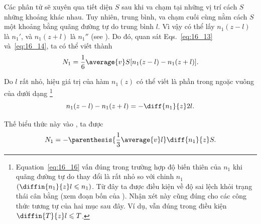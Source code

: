 Các phân tử sẽ xuyên qua tiết diện $S$ sau khi va chạm tại những vị trí cách $S$ những khoảng khác nhau. Tuy nhiên, trung bình, va chạm cuối cùng nằm cách $S$ một khoảng bằng quãng đường tự do trung bình $l$. Vì vậy có thể lấy $n_1(z-l)$ là $n_1'$, và $n_1(z+l)$ là $n_1''$ (see ). Do đó, quan sát Eqs.~\eqref{eq:16_13} và~\eqref{eq:16_14}, ta có thể viết thành
\begin{equation}\label{eq:16_15}
    N_1 = \frac{1}{6}\average{v} S [n_1(z-l) - n_1(z+l)].
\end{equation}

Do $l$ rất nhỏ, hiệu giá trị của hàm $n_1(z)$ có thể viết là phần trong ngoặc vuông của  dưới dạng \footnote{Equation~\eqref{eq:16_16} vấn đúng trong trường hợp độ biến thiên của $n_1$ khi quãng đường tự do thay đổi là rất nhỏ so với chinh $n_1$  $(\diffin{n_1}{z}l\leqslant n_1)$. Từ đây ta được điều kiện về độ sai lệch khỏi trạng thái cân bằng (xem đoạn bốn của ). Nhận xét này cũng đúng cho các công thức tương tự của hai mục sau đây. Ví dụ,  vẫn đúng trong điều kiện $\diffin{T}{z}l\leqslant T$.}
\begin{equation}\label{eq:16_16}
    n_1(z-l) - n_1(z+l) = - \diff{n_1}{z}2l.
\end{equation}

\noindent
Thế biểu thức này vào , ta được
\begin{equation}\label{eq:16_17}
    N_1 = - \parenthesis{\frac{1}{3} \average{v} l}\diff{n_1}{z} S.
\end{equation}

